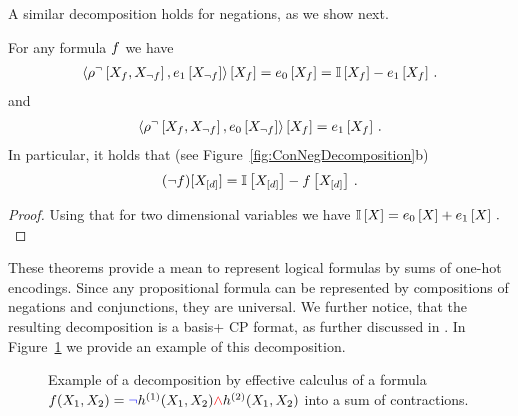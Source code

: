 A similar decomposition holds for negations, as we show next.

\begin{theorem}
	For any formula $f$ we have
	\begin{align*}
		\left\langle 
			\rho^{\lnot}\left[X_{f},X_{\lnot f}\right],e_{1}\left[X_{\lnot f}\right]
		\right\rangle \left[ X_{f} \right]
		= e_{0}\left[X_{f}\right] =  \mathbb{I}\left[X_{f}\right] - e_{1}\left[X_{f}\right] \, . 
	\end{align*}
	and
	\begin{align*}
		\left\langle 
			\rho^{\lnot}\left[X_{f},X_{\lnot f}\right],e_{0}\left[X_{\lnot f}\right]
		\right\rangle \left[ X_{f} \right]
		= e_{1}\left[X_{f}\right] \, . 
	\end{align*}
	In particular, it holds that (see Figure~\ref{fig:ConNegDecomposition}b)
	\begin{align*}
		(\lnot f)[X_{[d]}] = \mathbb{I}\left[X_{[d]}\right] - f\left[X_{[d]}\right]  \, . 
	\end{align*}
\end{theorem}
\begin{proof}
	Using that for two dimensional variables we have $\mathbb{I}\left[X\right]=e_{0}\left[X\right]+e_{1}\left[X\right]\, .$
\end{proof}

These theorems provide a mean to represent logical formulas by sums of one-hot encodings.
Since any propositional formula can be represented by compositions of negations and conjunctions, they are universal.
We further notice, that the resulting decomposition is a basis+ CP format, as further discussed in .
In Figure~\ref{fig:DecompositionExample} we provide an example of this decomposition.


\begin{figure}
\begin{center}
	
\end{center}
\caption{
	Example of a decomposition by effective calculus of a formula $f(X_{1},X_{2}) = \textcolor{blue}{\lnot} h^{(1)}(X_{1},X_{2}) \textcolor{red}{\land}  h^{(2)}(X_{1},X_{2})$ into a sum of contractions.}
	\label{fig:DecompositionExample}
\end{figure}





